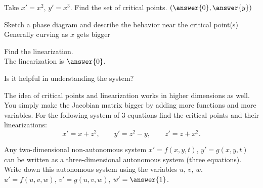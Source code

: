 \documentclass{ximera}
\begin{document}
\begin{exercise}
    Take $x'=x^2$, \enspace $y'=x^3$.
    Find the set of critical points. $\left(\answer{0}, \answer{y}\right)$
    \begin{problem}
        Sketch a phase diagram and describe the behavior near the critical point(s) \\
        Generally curving  as $x$ gets bigger
        
        \begin{problem}
            Find the linearization.\\
            The linearization is $\answer{0}$.
            \begin{feedback}[correct]
                Is it helpful in understanding the system?
            \end{feedback}
        \end{problem}
    \end{problem}
\end{exercise}


\begin{exercise}%
    The idea of critical points and linearization works in higher dimensions as well.  You simply make the Jacobian matrix bigger by adding more functions and more variables.  For the following system of 3 equations find the critical points and their linearizations:
    \begin{equation*}
        x' = x + z^2, \qquad y' = z^2-y, \qquad z' = z+x^2.
    \end{equation*}
\end{exercise}


\begin{exercise}%
    Any two-dimensional non-autonomous system $x'=f(x,y,t)$, $y'=g(x,y,t)$ can be written as a three-dimensional autonomous system (three equations).  Write down this autonomous system using the variables $u$, $v$, $w$.\\
    $u' = f(u,v,w)$, $v'=g(u,v,w)$, $w' = \answer{1}$.
\end{exercise}
\end{document}
